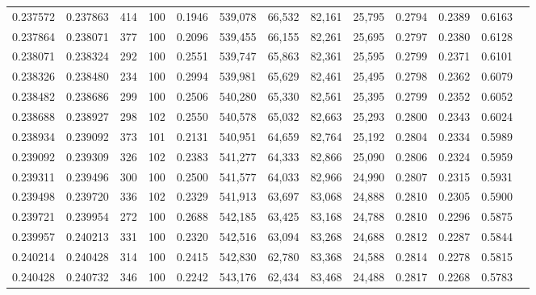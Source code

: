 \begin{tabular}{rrrrrrrrrrrrr}
0.237572 & 0.237863 &   414 & 100 &                                     0.1946 & 539,078 &  66,532 &  82,161 &  25,795 & 0.2794 & 0.2389 & 0.6163 \\
0.237864 & 0.238071 &   377 & 100 &                                     0.2096 & 539,455 &  66,155 &  82,261 &  25,695 & 0.2797 & 0.2380 & 0.6128 \\
0.238071 & 0.238324 &   292 & 100 &                                     0.2551 & 539,747 &  65,863 &  82,361 &  25,595 & 0.2799 & 0.2371 & 0.6101 \\
0.238326 & 0.238480 &   234 & 100 &                                     0.2994 & 539,981 &  65,629 &  82,461 &  25,495 & 0.2798 & 0.2362 & 0.6079 \\
0.238482 & 0.238686 &   299 & 100 &                                     0.2506 & 540,280 &  65,330 &  82,561 &  25,395 & 0.2799 & 0.2352 & 0.6052 \\
0.238688 & 0.238927 &   298 & 102 &                                     0.2550 & 540,578 &  65,032 &  82,663 &  25,293 & 0.2800 & 0.2343 & 0.6024 \\
0.238934 & 0.239092 &   373 & 101 &                                     0.2131 & 540,951 &  64,659 &  82,764 &  25,192 & 0.2804 & 0.2334 & 0.5989 \\
0.239092 & 0.239309 &   326 & 102 &                                     0.2383 & 541,277 &  64,333 &  82,866 &  25,090 & 0.2806 & 0.2324 & 0.5959 \\
0.239311 & 0.239496 &   300 & 100 &                                     0.2500 & 541,577 &  64,033 &  82,966 &  24,990 & 0.2807 & 0.2315 & 0.5931 \\
0.239498 & 0.239720 &   336 & 102 &                                     0.2329 & 541,913 &  63,697 &  83,068 &  24,888 & 0.2810 & 0.2305 & 0.5900 \\
0.239721 & 0.239954 &   272 & 100 &                                     0.2688 & 542,185 &  63,425 &  83,168 &  24,788 & 0.2810 & 0.2296 & 0.5875 \\
0.239957 & 0.240213 &   331 & 100 &                                     0.2320 & 542,516 &  63,094 &  83,268 &  24,688 & 0.2812 & 0.2287 & 0.5844 \\
0.240214 & 0.240428 &   314 & 100 &                                     0.2415 & 542,830 &  62,780 &  83,368 &  24,588 & 0.2814 & 0.2278 & 0.5815 \\
0.240428 & 0.240732 &   346 & 100 &                                     0.2242 & 543,176 &  62,434 &  83,468 &  24,488 & 0.2817 & 0.2268 & 0.5783 \\

\end{tabular}
